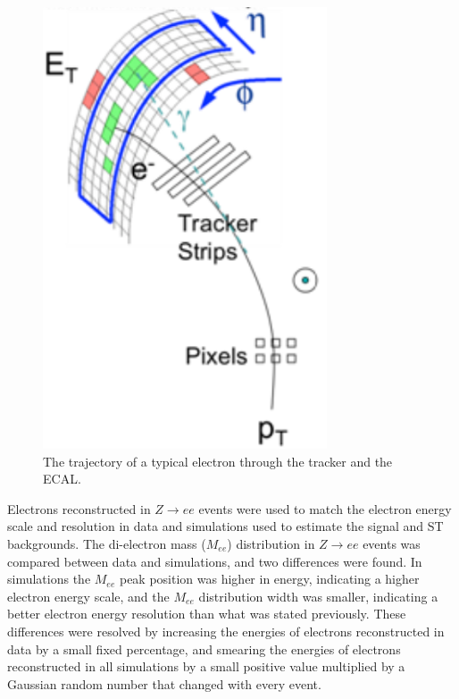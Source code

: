 \begin{figure}[h]
	\centering
	\includegraphics[width=0.75\textwidth]{figures/electronTrackAndSupercluster.png}
	\caption{The trajectory of a typical electron through the tracker and the ECAL.}
	\label{fig:eleTrackAndSC}
\end{figure}

Electrons reconstructed in $Z \rightarrow ee$ events were used to match the electron energy scale and resolution in data 
and simulations used to estimate the \WR signal and ST backgrounds.  The di-electron mass ($M_{ee}$) distribution in 
$Z \rightarrow ee$ events was compared between data and simulations, and two differences were found.  In simulations 
the $M_{ee}$ peak position was higher in energy, indicating a higher electron energy scale, and the $M_{ee}$ distribution width 
was smaller, indicating a better electron energy resolution than what was stated previously.  These differences 
were resolved by increasing the energies of electrons reconstructed in data by a small fixed percentage, and smearing the energies 
of electrons reconstructed in all simulations by a small positive value multiplied by a Gaussian random number that changed 
with every event.


